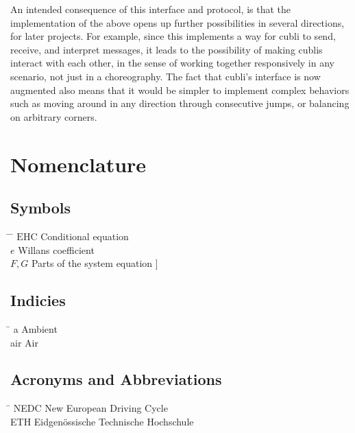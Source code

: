 An intended consequence of this interface and protocol, is that the implementation of the above opens up further possibilities in several directions, for later projects. 
For example, since this implements a way for cubli to send, receive, and interpret messages, it leads to the possibility of making cublis interact with each other, in the sense of working together responsively in any scenario, not just in a choreography.
The fact that cubli's interface is now augmented also means that it would be simpler to implement complex behaviors such as moving around in any direction through consecutive jumps, or balancing on arbitrary corners.


 \cleardoublepage


\chapter*{Nomenclature}\label{chap:symbole}

\section*{Symbols}
\begin{tabbing}
 \hspace*{1.6cm} \= \hspace*{8cm} \= \kill
 $\mathrm{EHC}$ \> Conditional equation \> [$-$] \\[0.5ex]
 $e$ \> Willans coefficient \> [$-$] \\[0.5ex]
 $F,G$ \> Parts of the system equation \> [\unitfrac[]{K}{s}]
\end{tabbing}

\section*{Indicies}
\begin{tabbing}
 \hspace*{1.6cm}  \= \kill
 a \> Ambient \\[0.5ex]
 air \> Air
\end{tabbing}

\section*{Acronyms and Abbreviations}
\begin{tabbing}
 \hspace*{1.6cm}  \= \kill
 NEDC \> New European Driving Cycle \\[0.5ex]
 ETH \> Eidgen\"{o}ssische Technische Hochschule
\end{tabbing}

 \cleardoublepage

